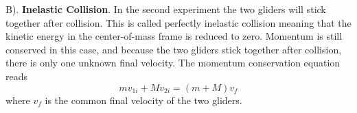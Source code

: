 B). \textbf{Inelastic Collision}. In the second experiment the two gliders will stick together after collision. This is called perfectly inelastic collision meaning that the kinetic energy in the center-of-mass frame is reduced to zero. Momentum is still conserved in this case, and because the two gliders stick together after collision, there is only one unknown final velocity. The momentum conservation equation reads
\begin{equation}
    mv_{1i} + Mv_{2i} = (m+M)v_f
\end{equation}
where $v_f$ is the common final velocity of the two gliders.






